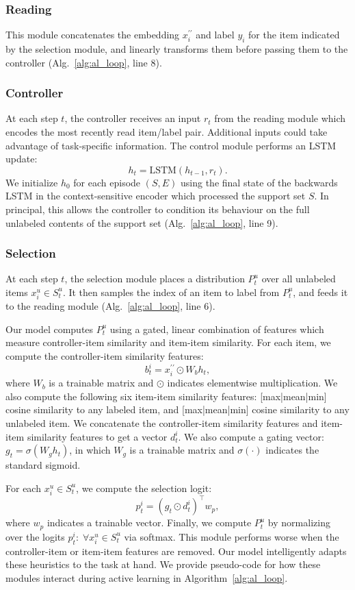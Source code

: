 \subsubsection{Reading}
This module concatenates the embedding $x^{\prime\prime}_i$ and label $y_i$ for the item indicated by the selection module, and linearly transforms them before passing them to the controller (Alg.~\ref{alg:al_loop}, line 8).

\subsubsection{Controller}
At each step $t$, the controller receives an input $r_t$ from the reading module which encodes the most recently read item/label pair. Additional inputs could take advantage of task-specific information. The control module performs an LSTM update:
$$h_t = \mbox{LSTM}(h_{t-1}, r_t).$$
We initialize $h_0$ for each episode $(S, E)$ using the final state of the backwards LSTM in the context-sensitive encoder which processed the support set $S$. In principal, this allows the controller to condition its behaviour on the full unlabeled contents of the support set  (Alg.~\ref{alg:al_loop}, line 9).

\subsubsection{Selection}
At each step $t$, the selection module places a distribution $P^u_t$ over all unlabeled items $x^u_i \in S^u_t$. It then samples the index of an item to label from $P^u_t$, and feeds it to the reading module (Alg.~\ref{alg:al_loop}, line 6).

Our model computes $P^u_t$ using a gated, linear combination of features which measure controller-item similarity and item-item similarity. For each item, we compute the controller-item similarity features:
$$b^i_t = x^{\prime\prime}_i \odot W_{b} h_t,$$
where $W_{b}$ is a trainable matrix and $\odot$ indicates elementwise multiplication.
We also compute the following six item-item similarity features: [max|mean|min] cosine similarity to any labeled item, and [max|mean|min] cosine similarity to any unlabeled item.
We concatenate the controller-item similarity features and item-item similarity features to get a vector $d^i_t$. We also compute a gating vector: $g_t = \sigma(W_g h_t)$, in which $W_g$ is a trainable matrix and $\sigma(\cdot)$ indicates the standard sigmoid.

For each $x^u_i \in S^u_t$, we compute the selection logit: $$p^i_t = (g_t \odot d^i_t)^{\top} w_p,$$ where $w_p$ indicates a trainable vector. Finally, we compute $P^u_t$ by normalizing over the logits $p^i_t: \; \forall x^u_i \in S^u_t$ via softmax. This module performs worse when the controller-item or item-item features are removed. Our model intelligently adapts these heuristics to the task at hand. We provide pseudo-code for how these modules interact during active learning in Algorithm~\ref{alg:al_loop}.

